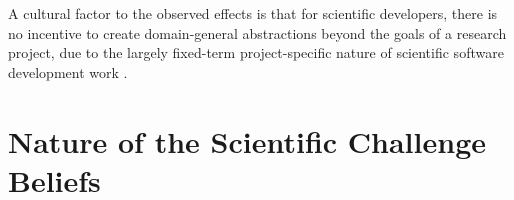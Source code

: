\documentclass[conference,10pt]{IEEEtran}
\begin{document}
A cultural factor to the observed effects is that for scientific developers, there is no incentive to create domain-general abstractions beyond the goals of a research project, due to the largely fixed-term project-specific nature of scientific software development work \cite{johan18_secs}. 

\section{Nature of the Scientific Challenge Beliefs}















\end{document}
